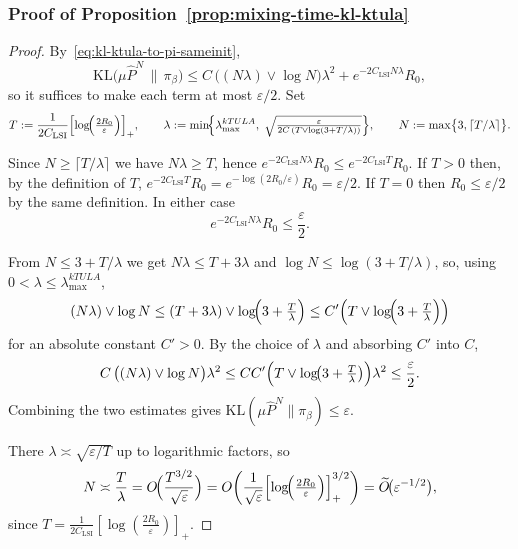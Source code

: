\documentclass[11pt,a4paper,reqno]{amsart}
\theoremstyle{plain}
\theoremstyle{definition}
\theoremstyle{remark}
\newcommand{\KL}{\mathrm{KL}}
\begin{document}
\subsubsection{Proof of Proposition~\ref{prop:mixing-time-kl-ktula}}
\label{proof:mixing-time-kl-ktula}
\begin{proof}
By~\eqref{eq:kl-ktula-to-pi-sameinit},
\[
  \KL\!\bigl(\mu\widehat P^{N}\,\big\|\,\pi_\beta\bigr)
  \le
  C\,\bigl((N\lambda)\vee \log N\bigr)\lambda^2
  + e^{-2C_{\mathrm{LSI}}N\lambda}R_0,
\]
so it suffices to make each term at most $\varepsilon/2$. Set
\[
  T:=\frac{1}{2C_{\mathrm{LSI}}}\Bigl[\log\!\Bigl(\tfrac{2R_0}{\varepsilon}\Bigr)\Bigr]_+,
  \qquad
  \lambda:=\min\!\Bigl\{\lambda_{\max}^{kTULA},\;
  \sqrt{\tfrac{\varepsilon}{2C\,(T\vee \log(3+T/\lambda))}}\Bigr\},
  \qquad
  N:=\max\bigl\{3,\lceil T/\lambda\rceil\bigr\}.
\]

Since $N\ge\lceil T/\lambda\rceil$ we have $N\lambda\ge T$, hence
$e^{-2C_{\mathrm{LSI}}N\lambda}R_0\le e^{-2C_{\mathrm{LSI}}T}R_0$. If $T>0$ then, by the definition of $T$,
$e^{-2C_{\mathrm{LSI}}T}R_0=e^{-\log(2R_0/\varepsilon)}R_0=\varepsilon/2$. If $T=0$ then $R_0\le\varepsilon/2$ by the same definition. In either case
\[
  e^{-2C_{\mathrm{LSI}}N\lambda}R_0\le \frac{\varepsilon}{2}.
\]

From $N\le 3+T/\lambda$ we get $N\lambda\le T+3\lambda$ and $\log N\le\log(3+T/\lambda)$, so, using $0<\lambda\le\lambda_{\max}^{kTULA}$,
\[
  (N\lambda)\vee \log N
  \le
  (T+3\lambda)\vee \log\!\Bigl(3+\tfrac{T}{\lambda}\Bigr)
  \le
  C'\Bigl(T\vee \log\!\Bigl(3+\tfrac{T}{\lambda}\Bigr)\Bigr)
\]
for an absolute constant $C'>0$. By the choice of $\lambda$ and absorbing $C'$ into $C$,
\[
  C\,\bigl((N\lambda)\vee \log N\bigr)\lambda^2
  \le
  CC'\Bigl(T\vee \log\!\bigl(3+\tfrac{T}{\lambda}\bigr)\Bigr)\lambda^2
  \le
  \frac{\varepsilon}{2}.
\]
Combining the two estimates gives $\KL(\mu\widehat P^{N}\|\pi_\beta)\le\varepsilon$.

There $\lambda\asymp\sqrt{\varepsilon/T}$ up to logarithmic factors, so
\[
  N\asymp \frac{T}{\lambda}
  =
  O\!\Bigl(\frac{T^{3/2}}{\sqrt{\varepsilon}}\Bigr)
  =
  O\!\left(
  \frac{1}{\sqrt{\varepsilon}}
  \Bigl[\log\!\Bigl(\tfrac{2R_0}{\varepsilon}\Bigr)\Bigr]_+^{3/2}
  \right)
  =
  \widetilde O\!\bigl(\varepsilon^{-1/2}\bigr),
\]
since $T=\tfrac{1}{2C_{\mathrm{LSI}}}[\log(\frac{2R_0}{\varepsilon})]_+$.
\end{proof}
\end{document}
